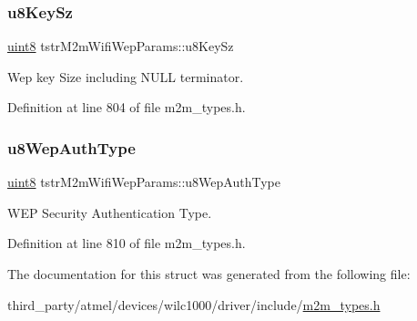 \mbox{\label{structtstrM2mWifiWepParams_ab2b55069d2a0efc1b6b4eba924dabe1b}} 
\subsubsection{\texorpdfstring{u8\+Key\+Sz}{u8KeySz}}
{\footnotesize\ttfamily \hyperlink{group__DataT_ga4df709a77647e870bbf1d955b8edc9a6}{uint8} tstr\+M2m\+Wifi\+Wep\+Params\+::u8\+Key\+Sz}

Wep key Size including N\+U\+LL terminator. 

Definition at line 804 of file m2m\+\_\+types.\+h.

\mbox{\label{structtstrM2mWifiWepParams_a89c70e5905a86f093a28812879d1612b}} 
\subsubsection{\texorpdfstring{u8\+Wep\+Auth\+Type}{u8WepAuthType}}
{\footnotesize\ttfamily \hyperlink{group__DataT_ga4df709a77647e870bbf1d955b8edc9a6}{uint8} tstr\+M2m\+Wifi\+Wep\+Params\+::u8\+Wep\+Auth\+Type}

W\+EP Security Authentication Type. 

Definition at line 810 of file m2m\+\_\+types.\+h.



The documentation for this struct was generated from the following file\+:\begin{DoxyCompactItemize}
\item 
third\+\_\+party/atmel/devices/wilc1000/driver/include/\hyperlink{m2m__types_8h}{m2m\+\_\+types.\+h}\end{DoxyCompactItemize}
